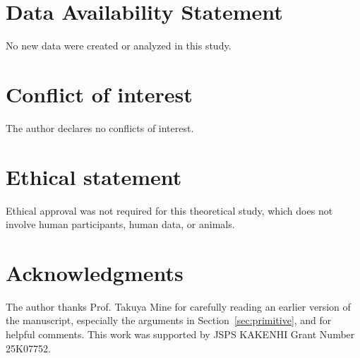 \documentclass[a4paper,12pt]{article}
\theoremstyle{definition}
\theoremstyle{remark}
\begin{document}
\section*{Data Availability Statement}
No new data were created or analyzed in this study.

\section*{Conflict of interest}
The author declares no conflicts of interest.

\section*{Ethical statement}
Ethical approval was not required for this theoretical study, which does not involve human participants, human data, or animals.

\section*{Acknowledgments}
The author thanks Prof. Takuya Mine for carefully reading an earlier version of the manuscript, 
especially the arguments in Section~\ref{sec:primitive}, and for helpful comments.
This work was supported by JSPS KAKENHI Grant Number 25K07752.
\end{document}
